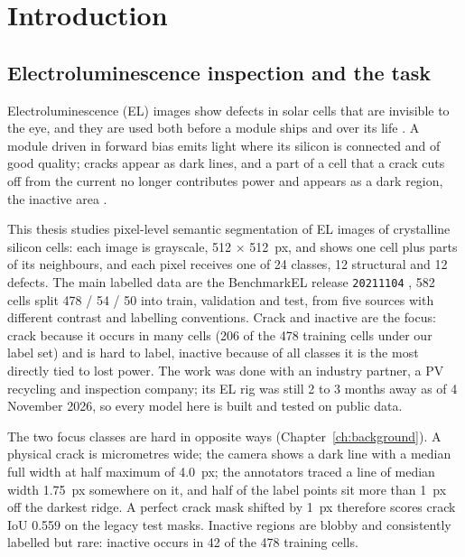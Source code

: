 \chapter{Introduction}\label{ch:intro}

\section{Electroluminescence inspection and the task}\label{sec:intro-task}

Electroluminescence (EL) images show defects in solar cells that are invisible to the eye, and they are used both before a module
ships and over its life \citep{pratt2023benchmark}. A module driven in forward bias emits light where its silicon is connected and
of good quality; cracks appear as dark lines, and a part of a cell that a crack cuts off from the current no longer contributes
power and appears as a dark region, the inactive area \citep{haase2018crackwidth,kontges2011risk}.

This thesis studies pixel-level semantic segmentation of EL images of crystalline silicon cells: each image is grayscale, 512
$\times$ 512~px, and shows one cell plus parts of its neighbours, and each pixel receives one of 24 classes, 12 structural and 12
defects. The main labelled data are the BenchmarkEL release \texttt{20211104} \citep{pratt2023benchmark}, 582 cells split 478 /
54 / 50 into train, validation and test, from five sources with different contrast and labelling conventions. Crack and inactive
are the focus: crack because it occurs in many cells (206 of the 478 training cells under our label set) and is hard to label,
inactive because of all classes it is the most directly tied to lost power. The work was done with an industry partner, a PV recycling and
inspection company; its EL rig was still 2 to 3 months away as of 4 November 2026, so every model here is built and tested on public
data.

The two focus classes are hard in opposite ways (Chapter~\ref{ch:background}). A physical crack is micrometres wide; the camera
shows a dark line with a median full width at half maximum of 4.0~px; the annotators traced a line of median width 1.75~px somewhere on
it, and half of the label points sit more than 1~px off the darkest ridge. A perfect crack mask shifted by 1~px therefore scores
crack IoU 0.559 on the legacy test masks. Inactive regions are blobby and consistently labelled but rare: inactive occurs in 42 of
the 478 training cells.

